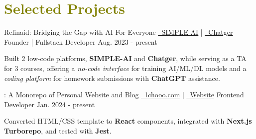
\section{\textcolor{olive}{\textbf{Selected Projects}}}
    \resumeSubHeadingListStart

    \resumeSubheading
            {Refinaid: Bridging the Gap with AI For Everyone}
            {
                \href{https://github.com/1chooo/simple-ai}{\underline{\faGithub\ SIMPLE AI}} 
                |
                \href{https://github.com/1chooo/chatger}{\underline{\faGithub\ Chatger}} 
            }
            {Founder | Fullstack Developer}
            {Aug. 2023 - present}

        \vspace{-1.0mm}

        \resumeItemListStart
            \item {Built 2 low-code platforms, \textbf{SIMPLE-AI} and \textbf{Chatger}, while serving as a TA for 3 courses, offering a \textit{no-code interface} for training AI/ML/DL models and a \textit{coding platform} for homework submissions with \textbf{ChatGPT} assistance.}
        \resumeItemListEnd

    \vspace{-2.0mm}

    \resumeSubheading
        {: A Monorepo of Personal Website and Blog} 
        {
        \href{https://github.com/1chooo/1chooo.com}{\underline{\faGithub\ 1chooo.com}} 
        |
        \href{https://www.1chooo.com}{\underline{\faDesktop\ Website}} 
        } %
        {Frontend Developer} %
        {Jan. 2024 - present} %
        
        \vspace{-1.0mm}
        
        \resumeItemListStart
            \item {Converted HTML/CSS template to \textbf{React} components, integrated with \textbf{Next.js Turborepo}, and tested with \textbf{Jest}.}
        \resumeItemListEnd

    \vspace{-2.0mm}
    


